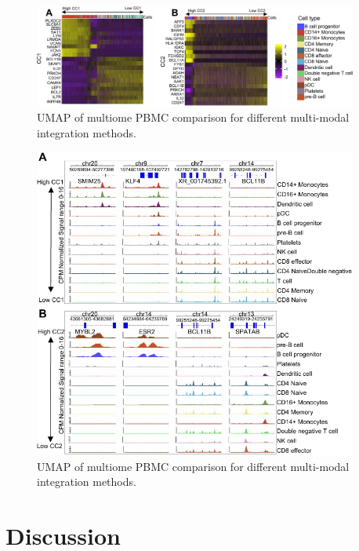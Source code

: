 \begin{figure}[!ht]
	\centering
	\includegraphics[width=0.95\textwidth]{CC_Genes/fig}
	\vspace{0.1cm}
	\caption[UMAP of multiome PBMC comparison for different multi-modal integration methods.]{UMAP of multiome PBMC comparison for different multi-modal integration methods.}
	\label{fig:CC_Genes}
\end{figure}



\begin{figure}[!ht]
	\centering
	\includegraphics[width=0.95\textwidth]{CC_Peaks/fig}
	\vspace{0.1cm}
	\caption[UMAP of multiome PBMC comparison for different multi-modal integration methods.]{UMAP of multiome PBMC comparison for different multi-modal integration methods.}
	\label{fig:CC_Peaks}
\end{figure}

\section{Discussion}



